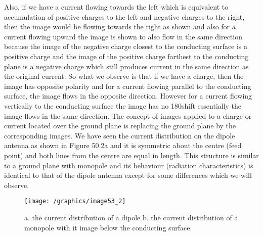 Also, if we have a current flowing towards the left which is equivalent to accumulation of positive charges to the left and negative charges to the right, then the image would be flowing towards the right as shown and also for a current flowing upward the image is shown to also flow in the same direction because the image of the negative charge closest to the conducting surface is a positive charge and the image of the positive charge farthest to the conducting plane is a negative charge which still produces current in the same direction as the original current. So what we observe is that if we have a charge, then the image has opposite polarity and for a current flowing parallel to the conducting surface, the image flows in the opposite direction. However for a current flowing vertically to the conducting surface the image has no 180\textdegree \space shift essentially the image flows in the same direction. The concept of images applied to a charge or current located over the ground plane is replacing the ground plane by the corresponding images. We have seen the current distribution on the dipole antenna as shown in Figure 50.2a and it is symmetric about the centre (feed point) and both lines from the centre are equal in length. This structure is similar to a ground plane with monopole and its behaviour (radiation characteristics) is identical to that of the dipole antenna except for some differences which we will observe.

\begin{figure}[h]
\centering
\texttt{[image: /graphics/image53\_2]}
\caption{a. the current distribution of a dipole 
	b. the current distribution of a monopole with it image below the conducting surface.}
\label{fig:fig2}
\end{figure}

